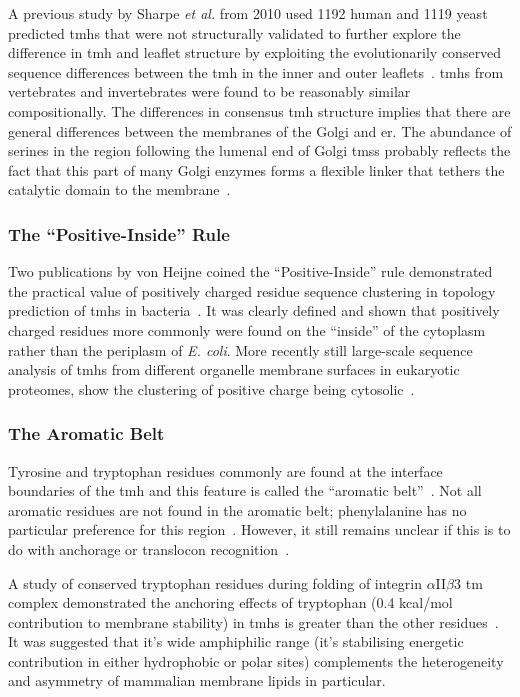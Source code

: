 A previous study by Sharpe \textit{et al.} from 2010 used 1192 human and 1119 yeast predicted \gls{tmh}s that were not structurally validated to further explore the difference in \gls{tmh} and leaflet structure by exploiting the evolutionarily conserved sequence differences between the \gls{tmh} in the inner and outer leaflets~\cite{Sharpe2010}.
\gls{tmh}s from vertebrates and invertebrates were found to be reasonably similar compositionally.
The differences in consensus \gls{tmh} structure implies that there are general differences between the membranes of the Golgi and \gls{er}.
The abundance of serines in the region following the lumenal end of Golgi \gls{tms}s probably reflects the fact that this part of many Golgi enzymes forms a flexible linker that tethers the catalytic domain to the membrane~\cite{Sharpe2010}.

\subsubsection{The ``Positive-Inside'' Rule}

Two publications by von Heijne coined the ``Positive-Inside'' rule demonstrated the practical value of positively charged residue sequence clustering in topology prediction of \gls{tmh}s in bacteria~\cite{VonHeijne1989,Andersson1992}.
It was clearly defined and shown that positively charged residues more commonly were found on the ``inside'' of the cytoplasm rather than the periplasm of \textit{ E.
coli}.
More recently still large-scale sequence analysis of \gls{tmh}s from different organelle membrane surfaces in eukaryotic proteomes, show the clustering of positive charge being cytosolic~\cite{Sharpe2010, Baeza-Delgado2013, Pogozheva2013}.

\subsubsection{The Aromatic Belt}

 Tyrosine and tryptophan residues commonly are found at the interface boundaries of the \gls{tmh} and this feature is called the ``aromatic belt''~\cite{Hessa2005, Granseth2005, Sharpe2010, Baeza-Delgado2013, Nilsson2005a}.
Not all aromatic residues are not found in the aromatic belt; phenylalanine has no particular preference for this region~\cite{Granseth2005, Braun1999}.
However, it still remains unclear if this is to do with anchorage or translocon recognition~\cite{Baeza-Delgado2013}.

A study of conserved tryptophan residues during folding of integrin $\alpha$II$\beta$3 \gls{tm} complex demonstrated the anchoring effects of tryptophan (0.4 kcal/mol contribution to membrane stability) in \gls{tmh}s is greater than the other residues~\cite{Situ2018}. It was suggested that it's wide amphiphilic range (it's stabilising energetic contribution in either hydrophobic or polar sites) complements the heterogeneity and asymmetry of mammalian membrane lipids in particular.

